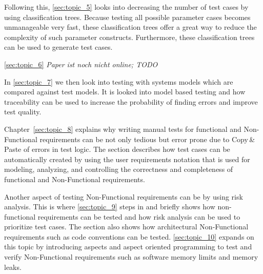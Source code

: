 

Following this,
\autoref{sec:topic_5} %
looks into decreasing the number of test cases by using classification trees.
Because testing all possible parameter cases becomes unmanageable very fast, these classification trees offer a great way to reduce the complexity of such parameter constructs.
Furthermore, these classification trees can be used to generate test cases.


\autoref{sec:topic_6} %
\textit{Paper ist noch nicht online; TODO}

In \autoref{sec:topic_7} %
we then look into testing with systems models which are compared against test models.
It is looked into model based testing and how traceability can be used to increase the probability of finding errors and improve test quality.

Chapter~\ref{sec:topic_8} %
explains why writing manual tests for functional and Non-Functional requirements can be  not only tedious but error prone due to Copy\,\&\,Paste of errors in test logic.
The section describes how test cases can be automatically created by using the user requirements notation that is used for modeling, analyzing, and controlling the correctness and completeness of functional and Non-Functional requirements.

Another aspect of testing Non-Functional requirements can be by using risk analysis.
This is where \autoref{sec:topic_9} %
steps in and briefly shows how non-functional requirements can be tested and how risk analysis can be used to prioritize test cases.
The section also shows how architectural Non-Functional requirements such as code conventions can be tested.
\autoref{sec:topic_10} %
expands on this topic by introducing aspects and aspect oriented programming to test and verify Non-Functional requirements such as software memory limits and memory leaks.

